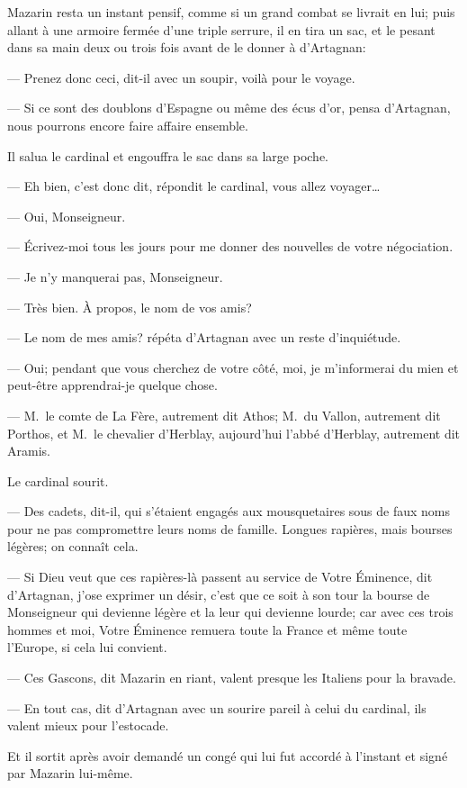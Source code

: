 Mazarin resta un instant pensif, comme si un grand combat se livrait en lui; puis allant à une armoire fermée d'une triple serrure, il en tira un sac, et le pesant dans sa main deux ou trois fois avant de le donner à d'Artagnan:

— Prenez donc ceci, dit-il avec un soupir, voilà pour le voyage.

— Si ce sont des doublons d'Espagne ou même des écus d'or, pensa d'Artagnan, nous pourrons encore faire affaire ensemble.

Il salua le cardinal et engouffra le sac dans sa large poche.

— Eh bien, c'est donc dit, répondit le cardinal, vous allez voyager\dots

— Oui, Monseigneur.

— Écrivez-moi tous les jours pour me donner des nouvelles de votre négociation.

— Je n'y manquerai pas, Monseigneur.

— Très bien. À propos, le nom de vos amis?

— Le nom de mes amis? répéta d'Artagnan avec un reste d'inquiétude.

— Oui; pendant que vous cherchez de votre côté, moi, je m'informerai du mien et peut-être apprendrai-je quelque chose.

— M.~le comte de La Fère, autrement dit Athos; M.~du Vallon, autrement dit Porthos, et M.~le chevalier d'Herblay, aujourd'hui l'abbé d'Herblay, autrement dit Aramis.

Le cardinal sourit.

— Des cadets, dit-il, qui s'étaient engagés aux mousquetaires sous de faux noms pour ne pas compromettre leurs noms de famille. Longues rapières, mais bourses légères; on connaît cela.

— Si Dieu veut que ces rapières-là passent au service de Votre Éminence, dit d'Artagnan, j'ose exprimer un désir, c'est que ce soit à son tour la bourse de Monseigneur qui devienne légère et la leur qui devienne lourde; car avec ces trois hommes et moi, Votre Éminence remuera toute la France et même toute l'Europe, si cela lui convient.

— Ces Gascons, dit Mazarin en riant, valent presque les Italiens pour la bravade.

— En tout cas, dit d'Artagnan avec un sourire pareil à celui du cardinal, ils valent mieux pour l'estocade.

Et il sortit après avoir demandé un congé qui lui fut accordé à l'instant et signé par Mazarin lui-même.

